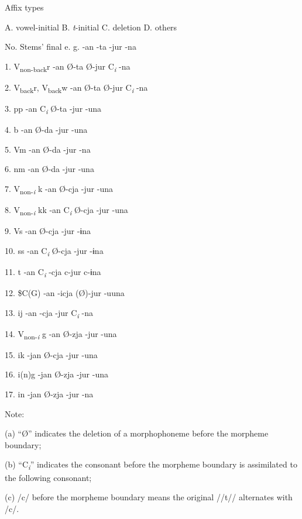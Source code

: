 \begin{table}
\caption{\label{tab:key:58}Different applications of rules to verbal stems and affixes showing their surface forms}

    Affix types

    A. vowel-initial  B. \textit{t}{}-initial  C. deletion  D. others

No.  Stems’ final  e. g.  {}-an  {}-ta  {}-jur  {}-na

1.  V\textsubscript{non-back}r    {}-an  Ø-ta  Ø-jur  C\textit{\textsubscript{i} }{}-na

2.  V\textsubscript{back}r, V\textsubscript{back}w    {}-an  Ø-ta  Ø-jur  C\textit{\textsubscript{i} }{}-na

3.  pp    {}-an  C\textit{\textsubscript{i} }Ø-ta  {}-jur  {}-una

4.  b    {}-an  Ø-da  {}-jur  {}-una

5.  Vm    {}-an  Ø-da  {}-jur  {}-na

6.  nm    {}-an  Ø-da  {}-jur  {}-una

7.  V\textsubscript{non-}\textit{\textsubscript{i}} k    {}-an  Ø-cja  {}-jur  {}-una

8.  V\textsubscript{non-}\textit{\textsubscript{i}} kk    {}-an  C\textit{\textsubscript{i} }Ø-cja  {}-jur  {}-una

9.  Vs    {}-an  Ø-cja  {}-jur  {}-ɨna

10.  ss    {}-an  C\textit{\textsubscript{i} }Ø-cja  {}-jur  {}-ɨna

11.  t    {}-an  C\textit{\textsubscript{i} }{}-cja  c-jur  c-ɨna

12.  \$C(G)    {}-an  {}-icja  (Ø)-jur  {}-uuna

13.  ij    {}-an  {}-cja  {}-jur  C\textit{\textsubscript{i} }{}-na

14.  V\textsubscript{non-}\textit{\textsubscript{i} }g    {}-an  Ø-zja  {}-jur  {}-una

15.  ik    {}-jan  Ø-cja  {}-jur  {}-una

16.  i(n)g    {}-jan  Ø-zja  {}-jur  {}-una

17.  in    {}-jan  Ø-zja  {}-jur  {}-na

Note:

(a) “Ø” indicates the deletion of a morphophoneme before the morpheme boundary;

(b) “C\textit{\textsubscript{i}}” indicates the consonant before the morpheme boundary is assimilated to the following consonant;

(c) /c/ before the morpheme boundary means the original //t// alternates with /c/.
\end{table}

